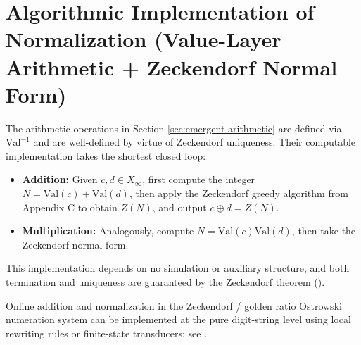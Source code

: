 \section{Algorithmic Implementation of Normalization (Value-Layer Arithmetic + Zeckendorf Normal Form)}
\label{app:normalization}

The arithmetic operations in Section \ref{sec:emergent-arithmetic} are defined via $\mathrm{Val}^{-1}$ and are well-defined by virtue of Zeckendorf uniqueness. Their computable implementation takes the shortest closed loop:
\begin{itemize}
  \item \textbf{Addition:} Given $c,d\in X_\infty$, first compute the integer $N=\mathrm{Val}(c)+\mathrm{Val}(d)$, then apply the Zeckendorf greedy algorithm from Appendix C to obtain $Z(N)$, and output $c\oplus d=Z(N)$.
  \item \textbf{Multiplication:} Analogously, compute $N=\mathrm{Val}(c)\mathrm{Val}(d)$, then take the Zeckendorf normal form.
\end{itemize}
This implementation depends on no simulation or auxiliary structure, and both termination and uniqueness are guaranteed by the Zeckendorf theorem (\cite{Zeckendorf1972}).

\begin{remark}\label{rem:zeckendorf-normalize-fst}
Online addition and normalization in the Zeckendorf / golden ratio Ostrowski numeration system can be implemented at the pure digit-string level using local rewriting rules or finite-state transducers; see \cite{Frougny1992NumbersAutomata,Frougny1999OnlineAddition,AhlbachUsatineFrougnyPippenger2013,HieronymiTerry2018OstrowskiAddition}.
\end{remark}
